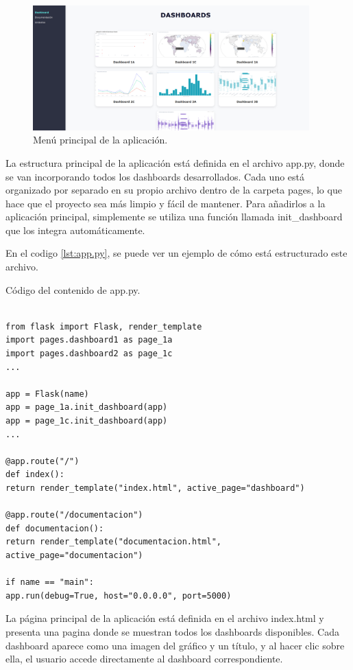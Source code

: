 \documentclass[a4paper, 12pt]{book}
\begin{document}
\begin{figure}[H]
\centering
\includegraphics[width=0.95\textwidth]{img/menu.png}
\caption{Menú principal de la aplicación.}
\label{fig:menu}
\end{figure}

La estructura principal de la aplicación está definida en el archivo app.py, donde se van incorporando todos los dashboards desarrollados. Cada uno está organizado por separado en su propio archivo dentro de la carpeta pages, lo que hace que el proyecto sea más limpio y fácil de mantener. Para añadirlos a la aplicación principal, simplemente se utiliza una función llamada init\_dashboard que los integra automáticamente.

En el codigo \ref{lst:app.py}, se puede ver un ejemplo de cómo está estructurado este archivo.

\begin{listing}[h!]
\caption{Código del contenido de app.py.}
\label{lst:app.py}
\begin{verbatim}

from flask import Flask, render_template
import pages.dashboard1 as page_1a
import pages.dashboard2 as page_1c
...

app = Flask(name)
app = page_1a.init_dashboard(app)
app = page_1c.init_dashboard(app)
...

@app.route("/")
def index():
return render_template("index.html", active_page="dashboard")

@app.route("/documentacion")
def documentacion():
return render_template("documentacion.html", active_page="documentacion")

if name == "main":
app.run(debug=True, host="0.0.0.0", port=5000)

\end{verbatim}
\end{listing}

La página principal de la aplicación está definida en el archivo index.html y presenta una pagina donde se muestran todos los dashboards disponibles. Cada dashboard aparece como una imagen del gráfico y un título, y al hacer clic sobre ella, el usuario accede directamente al dashboard correspondiente.
\end{document}
